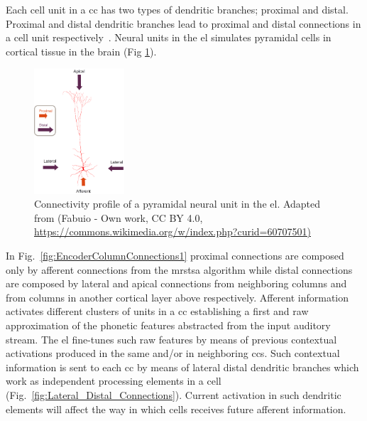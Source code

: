 {Each cell unit in a \gls{cc} has two types of dendritic branches; proximal and distal. Proximal and distal dendritic branches lead to proximal and distal connections in a cell unit respectively~\cite{10.1371/journal.pone.0217966}. Neural units in the \gls{el} simulates pyramidal cells in cortical tissue in the brain (Fig \ref{fig:Pyramidal_Cell}). 

\begin{figure}[h!]
    \centering
    \includegraphics[width=0.3\textwidth]{Pyramidal_Cell.png}
    \caption{Connectivity profile of a pyramidal neural unit in the \gls{el}. Adapted from (Fabuio - Own work, CC BY 4.0, \protect\url{https://commons.wikimedia.org/w/index.php?curid=60707501)}}
    \label{fig:Pyramidal_Cell}
\end{figure}

In Fig.~\ref{fig:EncoderColumnConnections1} proximal connections are composed only by afferent connections from the \gls{mrstsa} algorithm while distal connections are composed by lateral and apical connections from neighboring columns and from columns in another cortical layer above respectively. Afferent information activates different clusters of units in a \gls{cc} establishing a first and raw approximation of the phonetic features abstracted from the input auditory stream. The \gls{el} fine-tunes such raw features by means of previous contextual activations produced in the same and/or in neighboring \glspl{cc}. Such contextual information is sent to each \gls{cc} by means of lateral distal dendritic branches which work as independent processing elements in a cell (Fig.~\ref{fig:Lateral_Distal_Connections}). Current activation in such dendritic elements will affect the way in which cells receives future afferent information.

}
